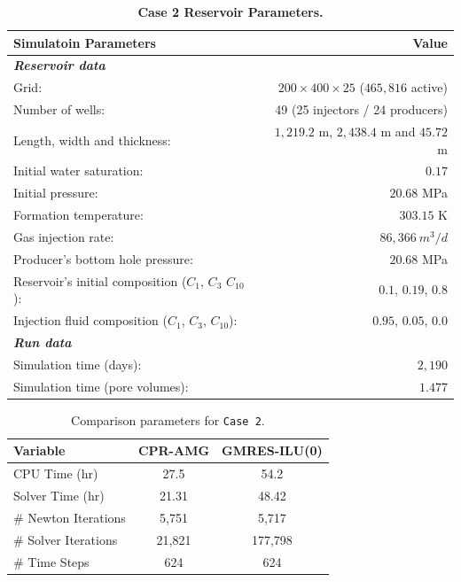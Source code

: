 \FloatBarrier
\begin{center}
\begin{table}[h!]
\begin{adjustbox}{width=0.8\textwidth}
    \begin{threeparttable}
    \caption{\textbf{Case 2 Reservoir Parameters\supercite{fernandes}.}}
    \label{case2}
        \begin{tabular}{l r }
            \toprule
            Simulatoin Parameters & Value\\
            \midrule
	\rowcolor{red!20}\textit{\textbf{Reservoir data}}      & \\
	Grid:      &           $200\times400\times25$ ($465,816$ active) \\
	\rowcolor{blue!5}Number of wells:      &  49 (25 injectors / 24 producers) \\
	Length, width and thickness:      & $1,219.2$ m, $2,438.4$ m and $45.72$ m\\
	Initial water saturation:    & $0.17$ \\      
	\rowcolor{blue!5}Initial pressure:    &      $20.68$ MPa\\
	Formation temperature:    & $303.15$ K     \\
	Gas injection rate:    &       $86,366 \ m^{3}/d$ \\
	\rowcolor{blue!5}Producer’s bottom hole pressure:    &       $20.68$ MPa\\
	Reservoir’s initial composition ($C_{1}$, $C_{3}$ $C_{10}$): & $0.1$, $0.19$, $0.8$\\
	\rowcolor{blue!5}Injection ﬂuid composition ($C_{1}$, $C_{3}$, $C_{10}$):    &   $0.95$, $0.05$, $0.0$\\
	\rowcolor{red!20}\textit{\textbf{Run data}}    &       \\
	Simulation time (days):    &  $2,190$\\
	\rowcolor{blue!5}Simulation time (pore volumes):    & $1.477$\\
            \bottomrule
        \end{tabular}
    \end{threeparttable}
\end{adjustbox}    
\end{table}
\end{center}
\FloatBarrier

\begin{table}[h!]
   \caption{Comparison parameters for \texttt{Case 2}.}
   \label{case2-tab}
   \small
   \centering
   \begin{tabular}{lcc}
   \toprule\toprule
   \textbf{Variable} & \textbf{CPR-AMG} & \textbf{GMRES-ILU(0)} \\
   \midrule
   CPU Time (hr) & 27.5 & 54.2 \\
   Solver Time (hr) & 21.31 & 48.42 \\
   \# Newton Iterations & 5,751 & 5,717 \\
   \# Solver Iterations & 21,821 & 177,798 \\
   \# Time Steps & 624 & 624 \\
   \bottomrule
   \end{tabular}
\end{table}

